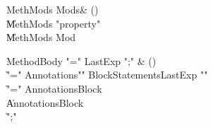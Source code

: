 \begin{bbgrammar}

MethMods \label{prod:MethMods}  \: Mods\opt & () \\

    \| MethMods \xcd"property"  \\
    \| MethMods Mod \\

\end{bbgrammar}

\begin{bbgrammar}

MethodBody \label{prod:MethodBody}  \: \xcd"=" LastExp \xcd";" & () \\

    \| \xcd"=" Annotations\opt \xcd"{" BlockStatements\opt LastExp \xcd"}" \\
    \| \xcd"=" Annotations\opt Block \\
    \| Annotations\opt Block \\
    \| \xcd";" \\

\end{bbgrammar}

